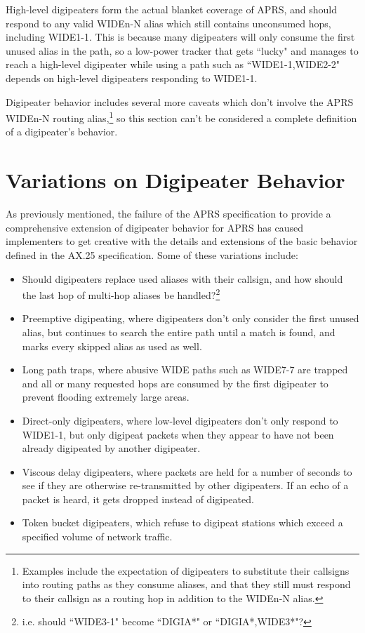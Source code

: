 High-level digipeaters form the actual blanket coverage of APRS, and
should respond to any valid WIDEn-N alias which still contains unconsumed hops,
including WIDE1-1. This is because many digipeaters will only consume the first
unused alias in the path, so a low-power tracker that gets ``lucky" and manages to
reach a high-level digipeater while using a path such as ``WIDE1-1,WIDE2-2"
depends on high-level digipeaters responding to WIDE1-1.

Digipeater behavior includes several more caveats which don't involve the APRS
WIDEn-N routing alias,\footnote{Examples include the expectation of digipeaters
	to substitute their callsigns into routing paths as they consume aliases,
	and that they still must respond to their callsign as a routing hop in 
addition to the WIDEn-N alias.} 
so this section can't be considered a complete definition of a digipeater's behavior.

\section{Variations on Digipeater Behavior}

As previously mentioned, the failure of the APRS specification to provide
a comprehensive extension of digipeater behavior for APRS has caused
implementers to get creative with the details and extensions of
the basic behavior defined in the AX.25 specification.
Some of these variations include:
\begin{itemize}
	\item Should digipeaters replace used aliases with their callsign, and
		how should the last hop of multi-hop aliases be handled?\footnote{i.e.
		should ``WIDE3-1" become ``DIGIA*" or ``DIGIA*,WIDE3*"?}
	\item Preemptive digipeating, where digipeaters don't only consider the
		first unused alias, but continues to search the entire path
		until a match is found, and marks every skipped alias as used as well.
	\item Long path traps, where abusive WIDE paths such as WIDE7-7 are trapped
		and all or many requested hops are consumed by the first digipeater
		to prevent flooding extremely large areas.
	\item Direct-only digipeaters, where low-level digipeaters don't only respond
		to WIDE1-1, but only digipeat packets when they appear to have not
		been already digipeated by another digipeater.
	\item Viscous delay digipeaters, where packets are held for a number of
		seconds to see if they are otherwise re-transmitted by other digipeaters.
		If an echo of a packet is heard, it gets dropped instead of digipeated.
	\item Token bucket digipeaters, which refuse to digipeat stations which
		exceed a specified volume of network traffic.
\end{itemize}

